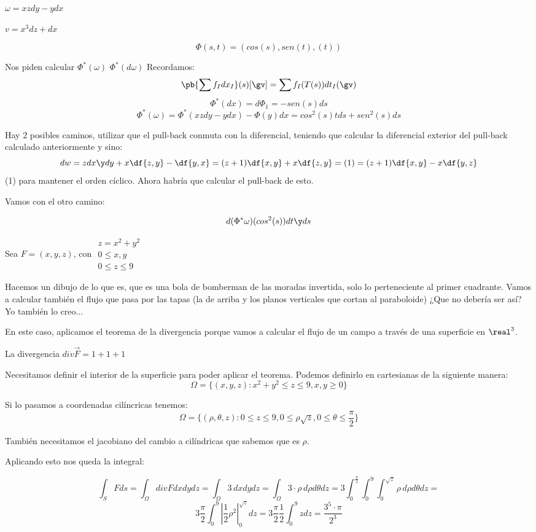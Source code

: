 \begin{problem}[9]
$\omega = xzdy - ydx$

$v = x^3dz+dx$


\[\Phi(s,t) = (cos(s),sen(t),(t))\]

Nos piden calcular
\ppart
$\Phi^{\ast}(\omega)$
\ppart
$\Phi^{\ast}(d\omega)$
\solution
Recordamos:
\[\pb{\sum f_Idx_I}(s)[\gv] = \sum f_I(T(s))dt_I(\gv)\]
\[\Phi^{\ast}(dx)=d\Phi_1 = -sen(s)ds\]
\spart
\[\Phi^{\ast}(\omega) = \Phi^{\ast} (xzdy - ydx) - \Phi(y)dx = cos^2(s)tds +sen^2(s)ds\]
\spart

Hay 2 posibles caminos, utilizar que el pull-back conmuta con la diferencial, teniendo que calcular la diferencial exterior del pull-back calculado anteriormente y sino:
\[dw = zdx\y dy + x\df{z,y} - \df{y,x} = (z+1)\df{x,y} + x\df{z,y} = (1) = (z+1)\df{x,y} - x\df{y,z}\]
(1) para mantener el orden cíclico.
Ahora habría que calcular el pull-back de esto.

Vamos con el otro camino:

\[d(\Phi^{\ast}\omega) (cos^2(s))dt\y ds\]
\end{problem}

\begin{problem}[17]
Sea $F = (x,y,z)$, con $\begin{array}{cc}
z = x^2+y^2\\
0\leq x,y\\
0\leq z\leq 9
\end{array}$

\solution
Hacemos un dibujo de lo que es, que es una bola de bomberman de las moradas invertida, solo lo perteneciente al primer cuadrante.
Vamos a calcular también el flujo que pasa por las tapas (la de arriba y los planos verticales que cortan al paraboloide) ¿Que no debería ser así? Yo también lo creo...


En este caso, aplicamos el teorema de la divergencia porque vamos a calcular el flujo de un campo a través de una superficie en $\real^3$.

La divergencia $div \overrightarrow{F} = 1+1+1$

Necesitamos definir el interior de la superficie para poder aplicar el teorema. Podemos definirlo en cartesianas de la siguiente manera: \[\Omega = \{ (x,y,z): x^2+y^2\leq z\leq 9, x,y\geq 0\}\]

Si lo pasamos a coordenadas cilíncricas tenemos: \[\Omega = \{(\rho,\theta,z): 0\leq z\leq 9, 0\leq \rho \sqrt{z},0\leq\theta\leq\frac{\pi}{2}\}\]

También necesitamos el jacobiano del cambio a cilíndricas que sabemos que es $\rho$.

Aplicando esto nos queda la integral:

\[\int_S Fds =  \int_{\Omega} div F dxdydz = \int_{\Omega} 3\,dxdydz = \int_{\Omega}3\cdot\rho \,d\rho d\theta dz = 3 \int_0^{\frac{\pi}{2}} \int_0^9 \int_0^{\sqrt{z}} \rho\, d\rho d\theta dz =\]
\[
 3\frac{\pi}{2} \int_0^9 \left| \frac{1}{2} \rho^2\right|^{\sqrt{z}}_0 dz
 = 3\frac{\pi}{2} \frac{1}{2}\int_0^9 zdz = \frac{3^5\cdot \pi}{2^3}\]

\end{problem}

